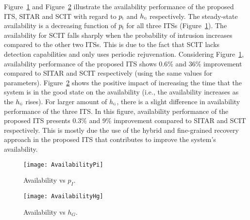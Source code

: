 \documentclass[preprint,number,12pt]{elsarticle}
\begin{document}
Figure~\ref{fig:AvailbilitypI} and Figure~\ref{fig:AvailbilityhG} illustrate the availability performance of the proposed ITS, SITAR and SCIT with regard to $p_{\scalebox{0.5}{I}}$ and $h_{\scalebox{0.5}{G}}$ respectively. The steady-state availability is a decreasing function of $p_{\scalebox{0.5}{I}}$ for all three ITSs (Figure~\ref{fig:AvailbilitypI}). The availability for SCIT falls sharply when the probability of intrusion increases compared to the other two ITSs. This is due to the fact that SCIT lacks detection capabilities and only uses periodic rejuvenation. Considering Figure~\ref{fig:AvailbilitypI}, availability performance of the proposed ITS shows 0.6\% and 36\% improvement compared to SITAR and SCIT respectively (using the same values for parameters). Figure~\ref{fig:AvailbilityhG} shows the positive impact of increasing the time that the system is in the good state on the availability (i.e., the availability increases as the $h_{\scalebox{0.5}{G}}$ rises). For larger amount of $h_{\scalebox{0.5}{G}}$, there is a slight difference in availability performance of the three ITS. In this figure, availability performance of the proposed ITS presents 0.3\% and 9\% improvement compared to SITAR and SCIT respectively. This is mostly due the use of the hybrid and fine-grained recovery approach in the proposed ITS that contributes to improve the system's availability.

\begin{figure}[!t]
\centering
\texttt{[image: AvailabilityPi]}
\caption{Availability vs $p_{I}$.}
\label{fig:AvailbilitypI}
\end{figure}
\begin{figure}[!t]
\centering
\texttt{[image: AvailabilityHg]}
\caption{Availability vs $h_{G}$.} 
\label{fig:AvailbilityhG}
\end{figure}
\end{document}
